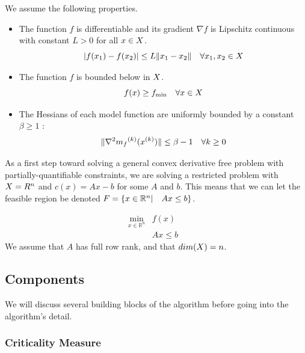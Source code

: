 We assume the following properties.

\begin{itemize}
\item The function $f$ is differentiable and its gradient $\nabla f$ is Lipschitz continuous with constant $L > 0$ for all $x \in X$.
\begin{equation}
\label{A1}
|f(x_1) - f(x_2)| \le L \|x_1 - x_2\| \quad \forall x_1, x_2 \in X
\end{equation}
\item \label{A2} The function $f$ is bounded below in $X$.
\begin{equation}
\label{A2}
f(x) \ge f_{\text{min}} \quad \forall x \in X
\end{equation}

\item The Hessians of each model function are uniformly bounded by a constant $\beta \ge 1$ :
\begin{equation}
\label{A3}
\|\nabla^2 {{m}_f}^{(k)}({x}^{(k)})\| \le \beta - 1 \quad \forall k \ge 0
\end{equation}

\end{itemize}

As a first step toward solving a general convex derivative free problem with partially-quantifiable constraints,
we are solving a restricted problem with $X = R^n$ and $c(x) = Ax-b$ for some $A$ and $b$.
This means that we can let the feasible region be denoted ${F} = \{x \in \mathbb R^n | \quad  Ax \le b \}$.

\[ \begin{array}{ccl} \min_{x \in \mathbb R^n} & f(x) \\
& Ax \le b & 
\end{array}
\]
We assume that $A$ has full row rank, and that  $dim(X) = n$.



\subsection{Components}

We will discuss several building blocks of the algorithm before going into the algorithm's detail.


\subsubsection{Criticality Measure}

